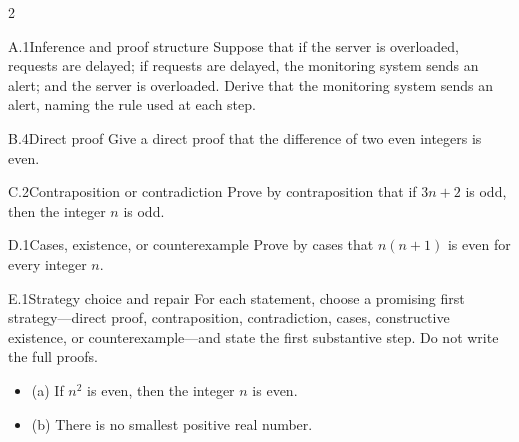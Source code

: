 \documentclass[9pt]{extarticle}
\begin{document}
\begin{multicols}{2}
\begin{CoreProblem}{A.1}{Inference and proof structure}
Suppose that if the server is overloaded, requests are delayed; if requests are
delayed, the monitoring system sends an alert; and the server is overloaded.
Derive that the monitoring system sends an alert, naming the rule used at each
step.
\end{CoreProblem}
\begin{CoreProblem}{B.4}{Direct proof}
Give a direct proof that the difference of two even integers is even.
\end{CoreProblem}
\begin{CoreProblem}{C.2}{Contraposition or contradiction}
Prove by contraposition that if $3n+2$ is odd, then the integer $n$ is odd.
\end{CoreProblem}
\columnbreak
\begin{CoreProblem}{D.1}{Cases, existence, or counterexample}
Prove by cases that $n(n+1)$ is even for every integer $n$.
\end{CoreProblem}
\begin{CoreProblem}{E.1}{Strategy choice and repair}
For each statement, choose a promising first strategy---direct proof,
contraposition, contradiction, cases, constructive existence, or
counterexample---and state the first substantive step. Do not write the full
proofs.
\begin{itemize}
  \item (a) If $n^2$ is even, then the integer $n$ is even.
  \item (b) There is no smallest positive real number.
\end{itemize}
\end{CoreProblem}
\end{multicols}
\CoreWorkArea
\FormBreak
{}
\end{document}
